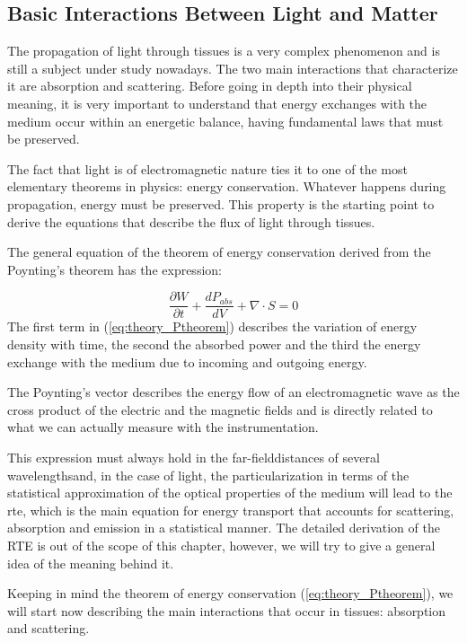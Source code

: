 \subsection{Basic Interactions Between Light and Matter}
The propagation of light through tissues is a very complex phenomenon and is still a subject under study nowadays. The two main interactions that characterize it are absorption and scattering. Before going in depth into their physical meaning, it is very important to understand that energy exchanges with the medium occur within an energetic balance, having fundamental laws that must be preserved.

The fact that light is of electromagnetic nature ties it to one of the most elementary theorems in physics: energy conservation. Whatever happens during propagation, energy must be preserved. This property is the starting point to derive the equations that describe the flux of light through tissues.

The general equation of the theorem of energy conservation derived from the Poynting's theorem has the expression:

\begin{equation}
\frac{\partial W}{\partial t}+\frac{dP_{abs}}{dV}+\nabla \cdot S=0
\label{eq:theory_Ptheorem}
\end{equation}
The first term in (\ref{eq:theory_Ptheorem}) describes the variation of energy density with time, the second the absorbed power and the third the energy exchange with the medium due to incoming and outgoing energy. 

The Poynting's vector describes the energy flow of an electromagnetic wave as the cross product of the electric and the magnetic fields and is directly related to what we can actually measure with the instrumentation.

This expression must always hold in the far-field\textemdash distances of several wavelengths\textemdash and, in the case of light, the particularization in terms of the statistical approximation of the optical properties of the medium will lead to the \gls{rte}, which is the main equation for energy transport that accounts for scattering, absorption and emission in a statistical manner. The detailed derivation of the RTE is out of the scope of this chapter, however, we will try to give a general idea of the meaning behind it.

Keeping in mind the theorem of energy conservation (\ref{eq:theory_Ptheorem}), we will start now describing the main interactions that occur in tissues: absorption and scattering.

